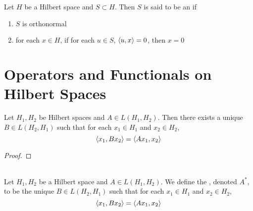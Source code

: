 \documentclass{book}
\begin{document}
\begin{defn} \ld{}
	Let $H$ be a Hilbert space and $S \subset H$. Then $S$ is said to be an  if 
	\begin{enumerate}
	\item $S$ is orthonormal
	\item for each $x \in H$, if for each $u \in S$, $\langle u, x \rangle = 0$, then $x =0$
	\end{enumerate}
\end{defn}






































\newpage

\section{Operators and Functionals on Hilbert Spaces}

\begin{ex}
	Let $H_1,H_2$ be Hilbert spaces and $A \in L(H_1, H_2)$. Then there exists a unique $B \in L(H_2, H_1)$ such that for each $x_1 \in H_1$ and $x_2 \in H_2$, 
	$$\langle x_1 , Bx_2 \rangle = \langle A x_1 , x_2 \rangle$$  
\end{ex}

\begin{proof}
	
\end{proof}

\begin{defn} \ld{} \\
	Let $H_1,H_2$ be a Hilbert space and $A \in L(H_1, H_2)$. We define the , denoted $A^*$, to be the unique $B \in L(H_2, H_1)$ such that for each $x_1 \in H_1$ and $x_2 \in H_2$, 
	$$\langle x_1 , Bx_2 \rangle = \langle A x_1 , x_2 \rangle$$  
\end{defn}
\end{document}
